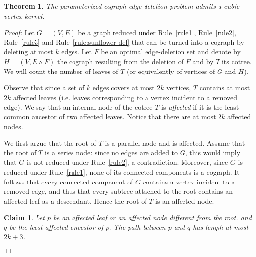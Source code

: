 \documentclass[11pt]{article}
\newenvironment{proof}{\noindent\textit{Proof: }}{{\hfill $\Box$}}
\newtheorem{theorem}[lemma]{Theorem}
\newtheorem{claim}[lemma]{Claim}
\begin{document}
\begin{theorem} \label{th:deletion}
The parameterized cograph edge-deletion problem admits a cubic vertex kernel.
\end{theorem}
\begin{proof}
Let $G = (V,E)$ be a graph reduced under Rule~\ref{rule1}, Rule~\ref{rule2}, Rule~\ref{rule3} and Rule~\ref{rule:sunflower-del} that can be turned into a cograph by deleting at most $k$ edges. Let $F$ be an optimal edge-deletion set and denote by $H = (V, E \vartriangle F)$ the cograph resulting from the deletion of $F$ and by $T$ its cotree. We will count the number of leaves of $T$ (or equivalently of vertices of $G$ and $H$).

Observe that since a set of $k$ edges covers at most $2k$ vertices, $T$ contains at most $2k$ affected leaves (i.e. leaves corresponding to a vertex incident to a removed edge).
We say that an internal node of the cotree $T$ is \emph{affected} if it is the least common ancestor of two affected leaves. Notice that there are at most $2k$ affected nodes.

We first argue that the root of $T$ is a parallel node and is affected. Assume that the root of $T$ is a series node: since no edges are added to $G$, this would imply that $G$ is not reduced under Rule~\ref{rule2}, a contradiction. Moreover, since $G$ is reduced under Rule~\ref{rule1}, none of its connected components is a cograph. It follows that every connected component of $G$ contains a vertex incident to a removed edge, and thus that every subtree attached to the root contains an affected leaf as a descendant. Hence the root of $T$ is an affected node.

\begin{claim}
\label{claim:kernel-del}
Let $p$ be an affected leaf or an affected node different from the root, and $q$ be the least affected ancestor of $p$. The path between $p$ and $q$ has length at most $2k + 3$.
\end{claim}


\end{proof}
\end{document}
